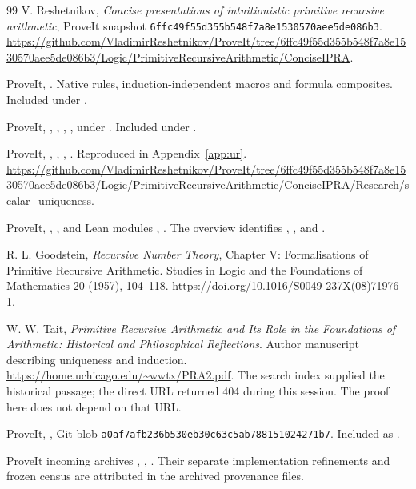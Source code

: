 \begin{thebibliography}{99}
V. Reshetnikov, \emph{Concise presentations of intuitionistic primitive
recursive arithmetic}, ProveIt snapshot
\texttt{6ffc49f55d355b548f7a8e1530570aee5de086b3}.
\url{https://github.com/VladimirReshetnikov/ProveIt/tree/6ffc49f55d355b548f7a8e1530570aee5de086b3/Logic/PrimitiveRecursiveArithmetic/ConciseIPRA}.

ProveIt, .
Native rules, induction-independent macros and formula composites.
Included under .

ProveIt, , ,
, ,
under .
Included under .

ProveIt, ,
, ,
. Reproduced in Appendix~\ref{app:ur}.
\url{https://github.com/VladimirReshetnikov/ProveIt/tree/6ffc49f55d355b548f7a8e1530570aee5de086b3/Logic/PrimitiveRecursiveArithmetic/ConciseIPRA/Research/scalar_uniqueness}.

ProveIt, ,
, and Lean modules
, .
The overview identifies , ,
and .

R. L. Goodstein, \emph{Recursive Number Theory}, Chapter V:
Formalisations of Primitive Recursive Arithmetic.
Studies in Logic and the Foundations of Mathematics 20 (1957),
104--118. \url{https://doi.org/10.1016/S0049-237X(08)71976-1}.

W. W. Tait, \emph{Primitive Recursive Arithmetic and Its Role in the
Foundations of Arithmetic: Historical and Philosophical Reflections}.
Author manuscript describing uniqueness and induction.
\url{https://home.uchicago.edu/~wwtx/PRA2.pdf}.
The search index supplied the historical passage; the direct URL returned
404 during this session. The proof here does not depend on that URL.

ProveIt,
,
Git blob \texttt{a0af7afb236b530eb30c63c5ab788151024271b7}.
Included as .

ProveIt incoming archives ,
, .
Their separate implementation refinements and frozen census are
attributed in the archived provenance files.
\end{thebibliography}

